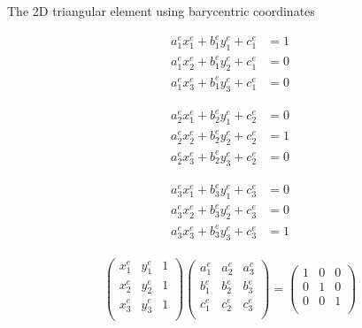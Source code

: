 \documentclass[handout]{beamer}
{
\usepackage{fullpage}
\usepackage{hyperref}
\usepackage{amssymb} 
}
\newcommand{\pmat}[1]{\begin{pmatrix}#1\end{pmatrix}}
\begin{document}
\begin{frame}{The 2D triangular element using barycentric coordinates}
\centering
\begin{minipage}{0.45\textwidth}
\begin{align*}
a^e_1 x_1^e + b^e_1 y_1^e + c^e_1 &= 1   \\
a^e_1 x_2^e + b^e_1 y_2^e + c^e_1 &= 0   \\
a^e_1 x_3^e + b^e_1 y_3^e + c^e_1 &= 0 
\end{align*}
\end{minipage}
\begin{minipage}{0.45\textwidth}
\begin{align*}
a^e_2 x_1^e + b^e_2 y_1^e + c^e_2 &= 0   \\
a^e_2 x_2^e + b^e_2 y_2^e + c^e_2 &= 1   \\
a^e_2 x_3^e + b^e_2 y_3^e + c^e_2 &= 0   
\end{align*}
\end{minipage}
\begin{minipage}{0.45\textwidth}
\begin{align*}
a^e_3 x_1^e + b^e_3 y_1^e + c^e_3 &= 0   \\
a^e_3 x_2^e + b^e_3 y_2^e + c^e_3 &= 0   \\
a^e_3 x_3^e + b^e_3 y_3^e + c^e_3 &= 1   
\end{align*}
\end{minipage}

\begin{minipage}{0.65\textwidth}
\begin{align*}
\pmat{x^e_1 & y^e_1 & 1     \\
      x^e_2 & y^e_2 & 1     \\
      x^e_3 & y^e_3 & 1     \\
} 
\pmat{a^e_1 & a^e_2 & a^e_3 \\
      b^e_1 & b^e_2 & b^e_3 \\
      c^e_1 & c^e_2 & c^e_3 \\
}
=
\pmat{1     & 0     & 0     \\
      0     & 1     & 0     \\
      0     & 0     & 1     \\
}
\end{align*}
\end{minipage}



\end{frame}
\end{document}

